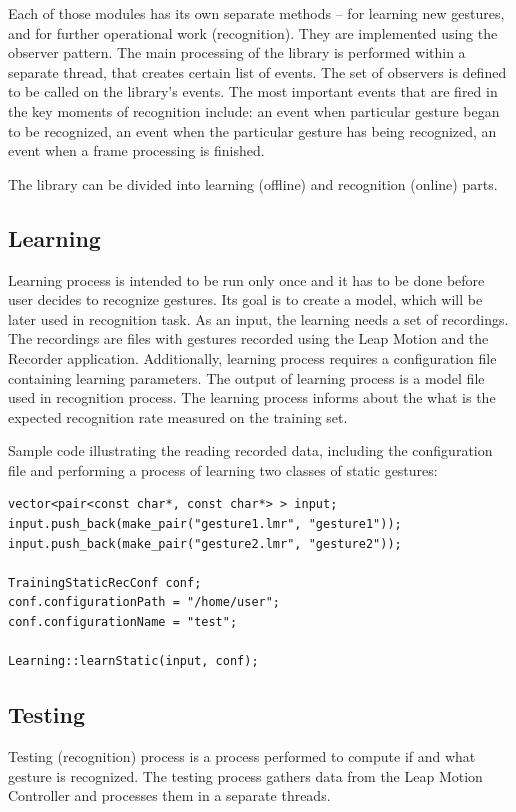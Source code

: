 Each of those modules has its own separate methods -- for learning new gestures, and for further operational work (recognition). They are implemented using the observer pattern.
The main processing of the library is performed within a separate thread, that creates certain list of events.
The set of observers is defined to be called on the library's events.
The most important events that are fired in the key moments of recognition include: an event when particular gesture began to be recognized, an event when the particular gesture has being recognized, an event when a frame processing is finished.

The library can be divided into learning (offline) and recognition (online) parts.

\subsection{Learning}

Learning process is intended to be run only once and it has to be done before user decides to recognize gestures. Its goal is to create a model, which will be later used in recognition task. As an input, the learning needs a set of recordings. The recordings are files with gestures recorded using the Leap Motion and the Recorder application. Additionally, learning process requires a configuration file containing learning parameters. The output of learning process is a model file used in recognition process.
The learning process informs about the what is the expected recognition rate measured on the training set.

Sample code illustrating the reading recorded data, including the configuration file and performing a process of learning two classes of static gestures:
\begin{lstlisting}
vector<pair<const char*, const char*> > input;
input.push_back(make_pair("gesture1.lmr", "gesture1"));
input.push_back(make_pair("gesture2.lmr", "gesture2"));

TrainingStaticRecConf conf;
conf.configurationPath = "/home/user";
conf.configurationName = "test";

Learning::learnStatic(input, conf);
\end{lstlisting}


\subsection{Testing}

Testing (recognition) process is a process performed to compute if and what gesture is recognized.
The testing process gathers data from the Leap Motion Controller and processes them in a separate threads.

